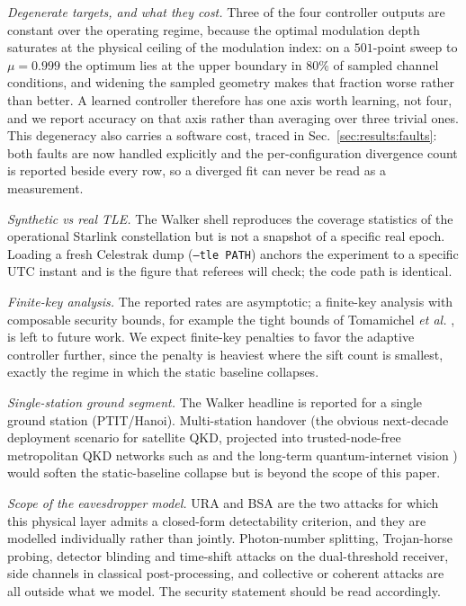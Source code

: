 \emph{Degenerate targets, and what they cost.} Three of the four controller outputs are constant over the operating regime, because the optimal modulation depth saturates at the physical ceiling of the modulation index: on a $501$-point sweep to $\mu{=}0.999$ the optimum lies at the upper boundary in $80\%$ of sampled channel conditions, and widening the sampled geometry makes that fraction worse rather than better. A learned controller therefore has one axis worth learning, not four, and we report accuracy on that axis rather than averaging over three trivial ones. This degeneracy also carries a software cost, traced in Sec.~\ref{sec:results:faults}: both faults are now handled explicitly and the per-configuration divergence count is reported beside every row, so a diverged fit can never be read as a measurement.

\emph{Synthetic vs real TLE.} The Walker shell reproduces the coverage statistics of the operational Starlink constellation but is not a snapshot of a specific real epoch. Loading a fresh Celestrak dump (\texttt{--tle PATH}) anchors the experiment to a specific UTC instant and is the figure that referees will check; the code path is identical.

\emph{Finite-key analysis.} The reported rates are asymptotic; a finite-key analysis with composable security bounds, for example the tight bounds of Tomamichel \emph{et al.} \cite{tomamichel2012tight}, is left to future work. We expect finite-key penalties to favor the adaptive controller further, since the penalty is heaviest where the sift count is smallest, exactly the regime in which the static baseline collapses.

\emph{Single-station ground segment.} The Walker headline is reported for a single ground station (PTIT/Hanoi). Multi-station handover (the obvious next-decade deployment scenario for satellite QKD, projected into trusted-node-free metropolitan QKD networks such as \cite{joshi2020trusted} and the long-term quantum-internet vision \cite{kimble2008quantum}) would soften the static-baseline collapse but is beyond the scope of this paper.

\emph{Scope of the eavesdropper model.} URA and BSA are the two attacks for which this physical layer admits a closed-form detectability criterion, and they are modelled individually rather than jointly. Photon-number splitting, Trojan-horse probing, detector blinding and time-shift attacks on the dual-threshold receiver, side channels in classical post-processing, and collective or coherent attacks are all outside what we model. The security statement should be read accordingly.

